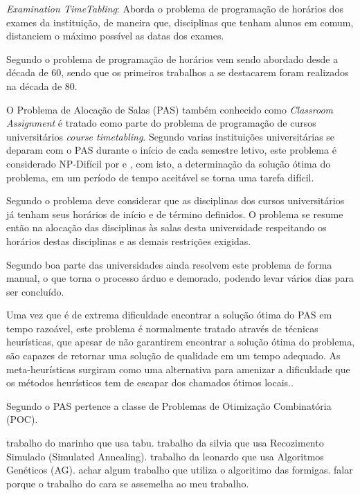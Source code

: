 \textit{Examination TimeTabling}: Aborda o problema de programação de horários dos exames da instituição, de maneira que, disciplinas que tenham alunos em comum, distanciem o máximo possível as datas dos exames.\par

Segundo \cite{pinheiro2001ambiente} o problema de programação de horários vem sendo abordado desde a década de 60, sendo que os primeiros trabalhos a se destacarem foram realizados na década de 80.\par

O Problema de Alocação de Salas (PAS) também conhecido como \textit{Classroom Assignment} é tratado como parte do problema de programação de cursos universitários \textit{course timetabling}. Segundo \cite{marinho2005heuristicas} varias instituições universitárias se deparam com o PAS durante o início de cada semestre letivo, este problema é considerado NP-Difícil por \cite{even1975complexity} e \cite{carter1992classroom}, com isto, a determinação da solução ótima do problema, em um período de tempo aceitável se torna uma tarefa difícil.\par
Segundo \cite{kripkasimulated} o problema deve considerar que as disciplinas dos cursos universitários já tenham seus horários de início e de término definidos. O problema se resume então na alocação das disciplinas às salas desta universidade respeitando os horários destas disciplinas e as demais restrições exigidas.

Segundo \cite{souza2000} boa parte das universidades ainda resolvem este problema de forma manual, o que torna o processo árduo e demorado, podendo levar vários dias para ser concluído.\par

Uma vez que é de extrema dificuldade encontrar a solução ótima do PAS em tempo razoável, este problema é normalmente tratado através de técnicas heurísticas, que apesar de não garantirem encontrar a solução ótima do problema, são capazes de retornar uma solução de qualidade em um tempo adequado. As meta-heurísticas surgiram como uma alternativa para amenizar a dificuldade que os métodos heurísticos tem de escapar dos chamados ótimos locais.\cite{nascimento2005aplicaccao}.\par

Segundo \cite{even1975complexity} o PAS pertence a classe de Problemas de Otimização Combinatória (POC).\par


trabalho do marinho que usa tabu.
trabalho da silvia que usa Recozimento Simulado (Simulated Annealing).
trabalho da leonardo que usa Algoritmos Genéticos (AG).
achar algum trabalho que utiliza o algoritimo das formigas.
falar porque o trabalho do cara se assemelha ao meu trabalho.